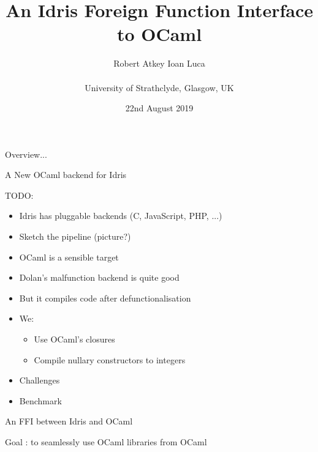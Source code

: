 \documentclass[aspectratio=169]{beamer}
\title{An Idris Foreign Function Interface to OCaml}
\author{Robert Atkey \qquad Ioan Luca\\
  \ \\
  University of Strathclyde, Glasgow, UK}
\date{22nd August 2019}
\begin{document}
\frame{\titlepage}

\newcommand{\youtem}{\quad \textcolor{titlered!80}{---} \quad}

\newcommand{\titlecard}[1]{\begin{frame}%
  \begin{center}%
    \Large \textcolor{titlered}{#1}%
  \end{center}%
\end{frame}}

\begin{frame}
  Overview...
\end{frame}

\titlecard{A New OCaml backend for Idris}

\begin{frame}
  TODO:
  \begin{itemize}
  \item Idris has pluggable backends (C, JavaScript, PHP, ...)
  \item<2-> Sketch the pipeline (picture?)
  \item<3-> OCaml is a sensible target
  \item<4-> Dolan's malfunction backend is quite good
  \item<5-> But it compiles code after defunctionalisation
  \item<6-> We:
    \begin{itemize}
    \item Use OCaml's closures
    \item Compile nullary constructors to integers
    \end{itemize}
  \item<7-> Challenges
  \item<8-> Benchmark
  \end{itemize}
\end{frame}

\begin{frame}
\end{frame}

\titlecard{An FFI between Idris and OCaml}

\begin{frame}
  Goal : to seamlessly use OCaml libraries from OCaml
\end{frame}
\end{document}
